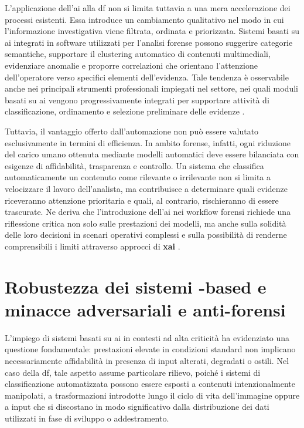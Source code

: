 L'applicazione dell'\gls{ai} alla \gls{df} non si limita tuttavia a una mera accelerazione dei processi esistenti. Essa introduce un cambiamento qualitativo nel modo in cui l'informazione investigativa viene filtrata, ordinata e priorizzata. Sistemi basati su \gls{ai} integrati in software utilizzati per l'analisi forense possono suggerire categorie semantiche, supportare il clustering automatico di contenuti multimediali, evidenziare anomalie e proporre correlazioni che orientano l'attenzione dell'operatore verso specifici elementi dell'evidenza. Tale tendenza è osservabile anche nei principali strumenti professionali impiegati nel settore, nei quali moduli basati su \gls{ai} vengono progressivamente integrati per supportare attività di classificazione, ordinamento e selezione preliminare delle evidenze \cite{sanna2025cybercrime,sanna2025pixelperfect}.

Tuttavia, il vantaggio offerto dall'automazione non può essere valutato esclusivamente in termini di efficienza. In ambito forense, infatti, ogni riduzione del carico umano ottenuta mediante modelli automatici deve essere bilanciata con esigenze di affidabilità, trasparenza e controllo. Un sistema che classifica automaticamente un contenuto come rilevante o irrilevante non si limita a velocizzare il lavoro dell'analista, ma contribuisce a determinare quali evidenze riceveranno attenzione prioritaria e quali, al contrario, rischieranno di essere trascurate. Ne deriva che l'introduzione dell'\gls{ai} nei workflow forensi richiede una riflessione critica non solo sulle prestazioni dei modelli, ma anche sulla solidità delle loro decisioni in scenari operativi complessi e sulla possibilità di renderne comprensibili i limiti attraverso approcci di \textbf{\gls{xai}} \cite{Adadi2018,Doshi-Velez2017,sanna2025cybercrime}.


\section[Robustezza dei sistemi AI-based e minacce adversariali e anti-forensi]{Robustezza dei sistemi -based e minacce adversariali e anti-forensi}
L'impiego di sistemi basati su \gls{ai} in contesti ad alta criticità ha evidenziato una questione fondamentale: prestazioni elevate in condizioni standard non implicano necessariamente affidabilità in presenza di input alterati, degradati o ostili. Nel caso della \gls{df}, tale aspetto assume particolare rilievo, poiché i sistemi di classificazione automatizzata possono essere esposti a contenuti intenzionalmente manipolati, a trasformazioni introdotte lungo il ciclo di vita dell'immagine oppure a input che si discostano in modo significativo dalla distribuzione dei dati utilizzati in fase di sviluppo o addestramento.

